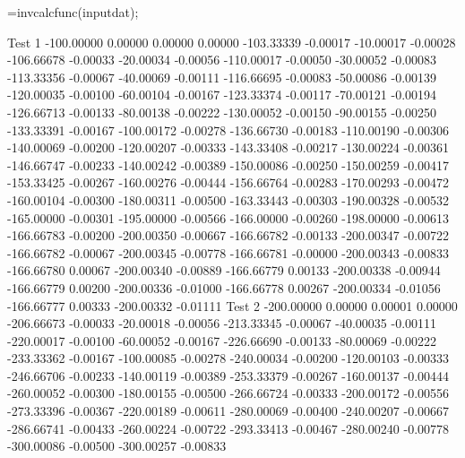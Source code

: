 \documentclass{article}
\begin{document}
\begin{matlabcode}
[p,e_p,q,e_q]=invcalcfunc(inputdat);
\end{matlabcode}
\begin{matlaboutput}
                    Test 1
-100.00000   0.00000       0.00000        0.00000
-103.33339  -0.00017     -10.00017       -0.00028
-106.66678  -0.00033     -20.00034       -0.00056
-110.00017  -0.00050     -30.00052       -0.00083
-113.33356  -0.00067     -40.00069       -0.00111
-116.66695  -0.00083     -50.00086       -0.00139
-120.00035  -0.00100     -60.00104       -0.00167
-123.33374  -0.00117     -70.00121       -0.00194
-126.66713  -0.00133     -80.00138       -0.00222
-130.00052  -0.00150     -90.00155       -0.00250
-133.33391  -0.00167    -100.00172       -0.00278
-136.66730  -0.00183    -110.00190       -0.00306
-140.00069  -0.00200    -120.00207       -0.00333
-143.33408  -0.00217    -130.00224       -0.00361
-146.66747  -0.00233    -140.00242       -0.00389
-150.00086  -0.00250    -150.00259       -0.00417
-153.33425  -0.00267    -160.00276       -0.00444
-156.66764  -0.00283    -170.00293       -0.00472
-160.00104  -0.00300    -180.00311       -0.00500
-163.33443  -0.00303    -190.00328       -0.00532
-165.00000  -0.00301    -195.00000       -0.00566
-166.00000  -0.00260    -198.00000       -0.00613
-166.66783  -0.00200    -200.00350       -0.00667
-166.66782  -0.00133    -200.00347       -0.00722
-166.66782  -0.00067    -200.00345       -0.00778
-166.66781  -0.00000    -200.00343       -0.00833
-166.66780   0.00067    -200.00340       -0.00889
-166.66779   0.00133    -200.00338       -0.00944
-166.66779   0.00200    -200.00336       -0.01000
-166.66778   0.00267    -200.00334       -0.01056
-166.66777   0.00333    -200.00332       -0.01111
                    Test 2
-200.00000   0.00000       0.00001        0.00000
-206.66673  -0.00033     -20.00018       -0.00056
-213.33345  -0.00067     -40.00035       -0.00111
-220.00017  -0.00100     -60.00052       -0.00167
-226.66690  -0.00133     -80.00069       -0.00222
-233.33362  -0.00167    -100.00085       -0.00278
-240.00034  -0.00200    -120.00103       -0.00333
-246.66706  -0.00233    -140.00119       -0.00389
-253.33379  -0.00267    -160.00137       -0.00444
-260.00052  -0.00300    -180.00155       -0.00500
-266.66724  -0.00333    -200.00172       -0.00556
-273.33396  -0.00367    -220.00189       -0.00611
-280.00069  -0.00400    -240.00207       -0.00667
-286.66741  -0.00433    -260.00224       -0.00722
-293.33413  -0.00467    -280.00240       -0.00778
-300.00086  -0.00500    -300.00257       -0.00833

\end{matlaboutput}
\end{document}

